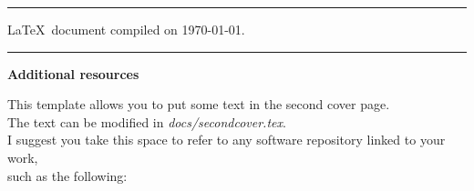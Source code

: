 \mbox{}
\vfill

{\small\onehalfspacing
\begin{center}

\noindent\rule{\textwidth}{1pt} %

    \LaTeX~document compiled on \today.

\noindent\rule{\textwidth}{.2pt} %

    \textbf{Additional resources}
    
    This template allows you to put some text in the second cover page.\\ 
    The text can be modified in \textit{docs/secondcover.tex}.\\
    I suggest you take this space to refer to any software repository linked to your work,\\ such as the following:\\

\end{center}
} %